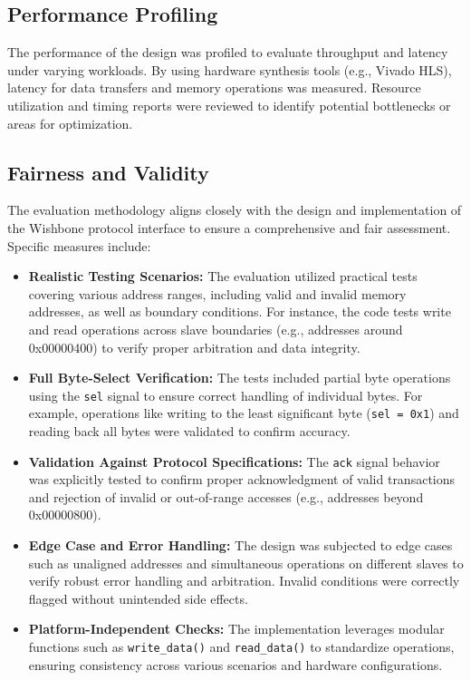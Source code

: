 \documentclass[conference]{IEEEtran}
\begin{document}
\subsection{Performance Profiling}
The performance of the design was profiled to evaluate throughput and latency under varying workloads. By using hardware synthesis tools (e.g., Vivado HLS), latency for data transfers and memory operations was measured. Resource utilization and timing reports were reviewed to identify potential bottlenecks or areas for optimization.

\subsection{Fairness and Validity}

The evaluation methodology aligns closely with the design and implementation of the Wishbone protocol interface to ensure a comprehensive and fair assessment. Specific measures include:

\begin{itemize}
    \item \textbf{Realistic Testing Scenarios:} The evaluation utilized practical tests covering various address ranges, including valid and invalid memory addresses, as well as boundary conditions. For instance, the code tests write and read operations across slave boundaries (e.g., addresses around 0x00000400) to verify proper arbitration and data integrity.
    
    \item \textbf{Full Byte-Select Verification:} The tests included partial byte operations using the \texttt{sel} signal to ensure correct handling of individual bytes. For example, operations like writing to the least significant byte (\texttt{sel = 0x1}) and reading back all bytes were validated to confirm accuracy.

    \item \textbf{Validation Against Protocol Specifications:} The \texttt{ack} signal behavior was explicitly tested to confirm proper acknowledgment of valid transactions and rejection of invalid or out-of-range accesses (e.g., addresses beyond 0x00000800).

    \item \textbf{Edge Case and Error Handling:} The design was subjected to edge cases such as unaligned addresses and simultaneous operations on different slaves to verify robust error handling and arbitration. Invalid conditions were correctly flagged without unintended side effects.

    \item \textbf{Platform-Independent Checks:} The implementation leverages modular functions such as \texttt{write\_data()} and \texttt{read\_data()} to standardize operations, ensuring consistency across various scenarios and hardware configurations.

\end{itemize}
\end{document}
